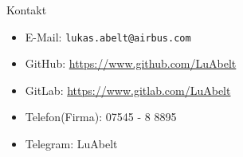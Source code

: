 \begin{frame}{Kontakt}{}
	\vfill
	\begin{itemize}
		\item E-Mail: \texttt{lukas.abelt@airbus.com}
		\item GitHub: \url{https://www.github.com/LuAbelt}
		\item GitLab: \url{https://www.gitlab.com/LuAbelt}
		\item Telefon(Firma): 07545 - 8 8895
		\item Telegram: LuAbelt
	\end{itemize}
	\vfill
\end{frame}